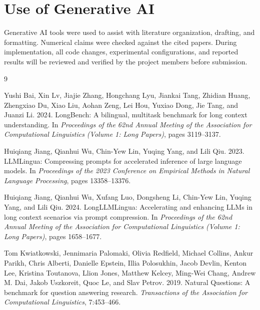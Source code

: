 \documentclass[10pt,a4paper,twocolumn]{article}
\begin{document}
\section{Use of Generative AI}

Generative AI tools were used to assist with literature organization, drafting, and formatting. Numerical claims were checked against the cited papers. During implementation, all code changes, experimental configurations, and reported results will be reviewed and verified by the project members before submission.

\begin{thebibliography}{9}

Yushi Bai, Xin Lv, Jiajie Zhang, Hongchang Lyu, Jiankai Tang, Zhidian Huang, Zhengxiao Du, Xiao Liu, Aohan Zeng, Lei Hou, Yuxiao Dong, Jie Tang, and Juanzi Li. 2024.
\newblock LongBench: A bilingual, multitask benchmark for long context understanding.
\newblock In \emph{Proceedings of the 62nd Annual Meeting of the Association for Computational Linguistics (Volume 1: Long Papers)}, pages 3119--3137.

Huiqiang Jiang, Qianhui Wu, Chin-Yew Lin, Yuqing Yang, and Lili Qiu. 2023.
\newblock LLMLingua: Compressing prompts for accelerated inference of large language models.
\newblock In \emph{Proceedings of the 2023 Conference on Empirical Methods in Natural Language Processing}, pages 13358--13376.

Huiqiang Jiang, Qianhui Wu, Xufang Luo, Dongsheng Li, Chin-Yew Lin, Yuqing Yang, and Lili Qiu. 2024.
\newblock LongLLMLingua: Accelerating and enhancing LLMs in long context scenarios via prompt compression.
\newblock In \emph{Proceedings of the 62nd Annual Meeting of the Association for Computational Linguistics (Volume 1: Long Papers)}, pages 1658--1677.

Tom Kwiatkowski, Jennimaria Palomaki, Olivia Redfield, Michael Collins, Ankur Parikh, Chris Alberti, Danielle Epstein, Illia Polosukhin, Jacob Devlin, Kenton Lee, Kristina Toutanova, Llion Jones, Matthew Kelcey, Ming-Wei Chang, Andrew M. Dai, Jakob Uszkoreit, Quoc Le, and Slav Petrov. 2019.
\newblock Natural Questions: A benchmark for question answering research.
\newblock \emph{Transactions of the Association for Computational Linguistics}, 7:453--466.


\end{thebibliography}
\end{document}
